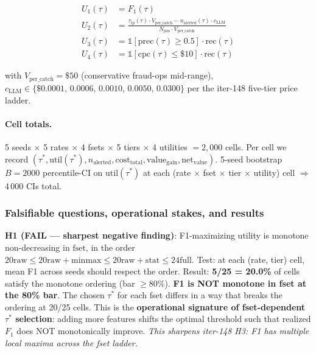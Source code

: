 \begin{align}
U_1(\tau)  &= F_1(\tau)                                                     \tag{F1} \\
U_2(\tau)  &= \frac{\tau_{tp}(\tau) \cdot V_{\text{per\_catch}} -
                    n_{\text{alerted}}(\tau) \cdot c_{\text{LLM}}}
                    {N_{\text{pos}} \cdot V_{\text{per\_catch}}}            \tag{VALUE} \\
U_3(\tau)  &= \mathbb{1}[\mathrm{prec}(\tau) \geq 0.5] \cdot \mathrm{rec}(\tau) \tag{PREC-CONSTRAINED} \\
U_4(\tau)  &= \mathbb{1}[\mathrm{cpc}(\tau) \leq \$10] \cdot \mathrm{rec}(\tau) \tag{COST-CONSTRAINED}
\end{align}

with $V_{\text{per\_catch}} = \$50$ (conservative fraud-ops mid-range),
$c_{\text{LLM}} \in \{\$0.0001,\,0.0006,\,0.0010,\,0.0050,\,0.0300\}$ per
the iter-148 five-tier price ladder.

\paragraph{Cell totals.} 5 seeds $\times$ 5 rates $\times$ 4 fsets
$\times$ 5 tiers $\times$ 4 utilities $= 2{,}000$ cells. Per cell we
record $(\tau^*, \mathrm{util}(\tau^*), n_{\text{alerted}},
\mathrm{cost}_{\text{total}}, \mathrm{value}_{\text{gain}},
\mathrm{net}_{\text{value}})$. 5-seed bootstrap $B=2000$
percentile-CI on $\mathrm{util}(\tau^*)$ at each
(rate $\times$ fset $\times$ tier $\times$ utility) cell $\Rightarrow$
4\,000 CIs total.

\subsubsection{Falsifiable questions, operational stakes, and results}

\textbf{H1 (FAIL — sharpest negative finding)}: F1-maximizing utility is
monotone non-decreasing in $\mathrm{fset}$, in the order
$\mathrm{20raw} \leq \mathrm{20raw+minmax} \leq \mathrm{20raw+stat}
\leq \mathrm{24full}$. Test: at each (rate, tier) cell, mean F1 across
seeds should respect the order. Result: \textbf{5/25 = 20.0\%} of cells
satisfy the monotone ordering (bar $\geq 80\%$). \textbf{F1 is NOT
monotone in fset at the 80\% bar}. The chosen $\tau^*$ for each fset
differs in a way that breaks the ordering at 20/25 cells. This is the
\textbf{operational signature of fset-dependent $\tau^*$ selection}:
adding more features shifts the optimal threshold such that realized
$F_1$ does NOT monotonically improve. \emph{This sharpens iter-148 H3:
F1 has multiple local maxima across the fset ladder.}

